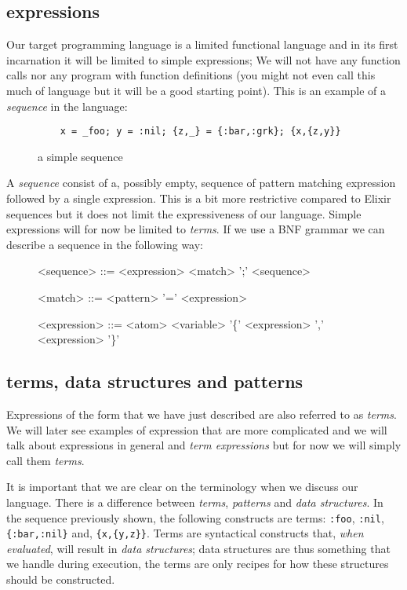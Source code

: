 \documentclass[a4paper,11pt]{article}
\begin{document}
\subsection{expressions}

Our target programming language is a limited functional language and
in its first incarnation it will be limited to simple expressions; We
will not have any function calls nor any program with function
definitions (you might not even call this much of language but it will
be a good starting point). This is an example of a {\em sequence} in
the language:

\begin{figure}[h]
\begin{verbatim}
    x = _foo; y = :nil; {z,_} = {:bar,:grk}; {x,{z,y}}
\end{verbatim} 
\caption{a simple sequence}
\label{fig:sequence}
\end{figure}

A {\em sequence} consist of a, possibly empty, sequence of pattern
matching expression followed by a single expression. This is a bit
more restrictive compared to Elixir sequences but it does not limit
the expressiveness of our language. Simple expressions will for now be
limited to {\em terms}. If we use a BNF grammar we can describe a
sequence in the following way:

\begin{figure}[h]
\begin{grammar}
<sequence> ::= <expression> \alt <match> ';' <sequence>

<match> ::= <pattern> '=' <expression> 

<expression> ::= <atom> \alt <variable> \alt '\{' <expression> ',' <expression> '\}'

\end{grammar}
\end{figure}

\subsection{terms, data structures and patterns}

Expressions of the form that we have just described are also referred
to as {\em terms}. We will later see examples of expression that are
more complicated and we will talk about expressions in general and
{\em term expressions} but for now we will simply call them {\em terms}.

It is important that we are clear on the terminology when we discuss
our language. There is a difference between {\em terms}, {\em
  patterns} and {\em data structures}. In the sequence previously
shown, the following constructs are terms: \verb+:foo+, \verb+:nil+,
\verb+{:bar,:nil}+ and, \verb+{x,{y,z}}+. Terms are syntactical
constructs that, {\em when evaluated}, will result in {\em data
  structures}; data structures are thus something that we handle
during execution, the terms are only recipes for how these structures
should be constructed.
\end{document}
